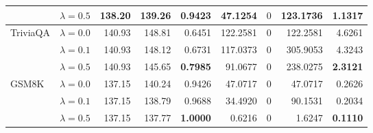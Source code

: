 \begin{table}[t]
{\begin{tabular}{l l rrrrrrr}
 & $\lambda{=}0.5$ & 138.20 & 139.26 & \cellcolor{red!18} \textbf{0.9423} & \cellcolor{red!18} 47.1254 & \cellcolor{cyan!12} $0$ & \cellcolor{red!18} 123.1736 & \cellcolor{red!18} \textbf{1.1317} \\
\midrule
TriviaQA & $\lambda{=}0.0$ & 140.93 & 148.81 & \cellcolor{red!35} 0.6451 & \cellcolor{red!35} 122.2581 & \cellcolor{cyan!12} $0$ & \cellcolor{red!35} 122.2581 & \cellcolor{red!35} 4.6261 \\
 & $\lambda{=}0.1$ & 140.93 & 148.12 & \cellcolor{red!35} 0.6731 & \cellcolor{red!35} 117.0373 & \cellcolor{cyan!12} $0$ & \cellcolor{red!35} 305.9053 & \cellcolor{red!35} 4.3243 \\
 & $\lambda{=}0.5$ & 140.93 & 145.65 & \cellcolor{red!35} \textbf{0.7985} & \cellcolor{red!35} 91.0677 & \cellcolor{cyan!12} $0$ & \cellcolor{red!35} 238.0275 & \cellcolor{red!35} \textbf{2.3121} \\
\midrule
GSM8K & $\lambda{=}0.0$ & 137.15 & 140.24 & \cellcolor{red!18} 0.9426 & \cellcolor{red!18} 47.0717 & \cellcolor{cyan!12} $0$ & \cellcolor{red!18} 47.0717 & \cellcolor{red!18} 0.2626 \\
 & $\lambda{=}0.1$ & 137.15 & 138.79 & 0.9688 & 34.4920 & \cellcolor{cyan!12} $0$ & 90.1531 & 0.2034 \\
 & $\lambda{=}0.5$ & 137.15 & 137.77 & \textbf{1.0000} & 0.6216 & \cellcolor{cyan!12} $0$ & 1.6247 & \textbf{0.1110} \\
\bottomrule
\end{tabular}}
\end{table}